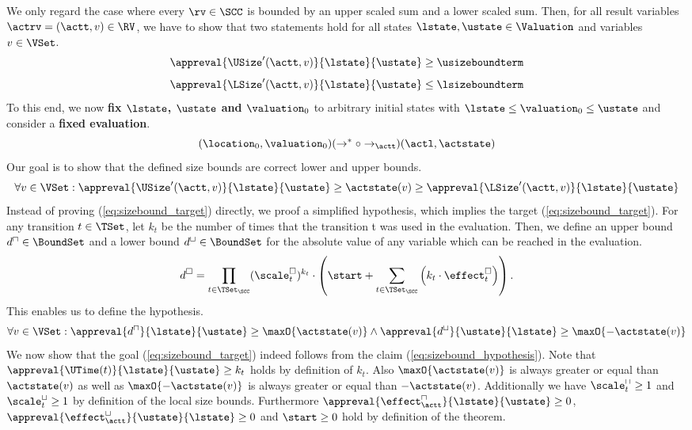 We only regard the case where every $\rv \in \SCC$ is bounded by an upper scaled sum and a lower scaled sum.
Then, for all result variables $\actrv = (\actt, v) \in \RV$, we have to show that two statements hold for all states $\lstate, \ustate \in \Valuation$ and variables $v \in \VSet$.
\[ \appreval{\USize'(\actt, v)}{\lstate}{\ustate} \geq \usizeboundterm \]
\[ \appreval{\LSize'(\actt, v)}{\lstate}{\ustate} \leq \lsizeboundterm \]
To this end, we now \textbf{fix $\lstate$, $\ustate$ and $\valuation_0$} to arbitrary initial states with $\lstate \leq \valuation_0 \leq \ustate$ and consider a \textbf{fixed evaluation}.
\[ (\location_0, \valuation_0) (\rightarrow^* \circ \rightarrow_\actt) (\actl, \actstate) \]
Our goal is to show that the defined size bounds are correct lower and upper bounds.
\begin{equation} \label{eq:sizebound_target}
  \forall v \in \VSet: \appreval{\USize'(\actt, v)}{\lstate}{\ustate} \geq \actstate(v) \geq \appreval{\LSize'(\actt, v)}{\lstate}{\ustate}
\end{equation}
Instead of proving (\ref{eq:sizebound_target}) directly, we proof a simplified hypothesis, which implies the target (\ref{eq:sizebound_target}).
For any transition $t \in \TSet$, let $k_t$ be the number of times that the transition t was used in the evaluation.
Then, we define an upper bound $d^\sqcap \in \BoundSet$ and a lower bound $d^\sqcup \in \BoundSet$ for the absolute value of any variable which can be reached in the evaluation.
\[ d^\square = \prod_{t \in \TSet_\SCC} (\scale^\square_t)^{k_t} \cdot \left( \start + \sum_{t \in \TSet_\SCC} \left( k_t \cdot \effect^\square_t \right) \right). \]
This enables us to define the hypothesis.
\begin{equation} \label{eq:sizebound_hypothesis}
  \forall v \in \VSet: \appreval{d^\sqcap}{\lstate}{\ustate} \geq \maxO{\actstate(v)} \wedge \appreval{d^\sqcup}{\ustate}{\lstate} \geq \maxO{-\actstate(v)}
\end{equation}
We now show that the goal (\ref{eq:sizebound_target}) indeed follows from the claim (\ref{eq:sizebound_hypothesis}).
Note that $\appreval{\UTime(t)}{\lstate}{\ustate} \geq k_t$ holds by definition of $k_t$.
Also $\maxO{\actstate(v)}$ is always greater or equal than $\actstate(v)$ as well as $\maxO{-\actstate(v)}$ is always greater or equal than $-\actstate(v)$.
Additionally we have $\scale^\sqcap_t \geq 1$ and $\scale^\sqcup_t \geq 1$ by definition of the local size bounds.
Furthermore $\appreval{\effect^\sqcap_\actt}{\lstate}{\ustate} \geq 0$, $\appreval{\effect^\sqcup_\actt}{\ustate}{\lstate} \geq 0$ and $\start \geq 0$ hold by definition of the theorem.

